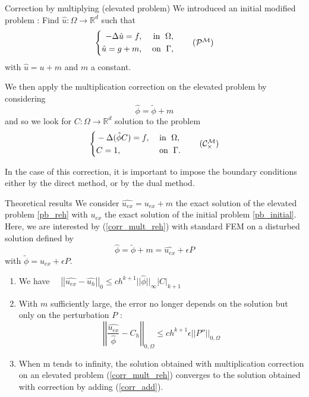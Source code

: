 \documentclass[compress,10pt,xcolor={table,dvipsnames},t]{beamer}
\begin{document}
	\begin{frame}{Correction by multiplying (elevated problem)}
		We introduced an initial modified problem : Find $\hat{u} : \Omega \rightarrow \mathbb{R}^d$ such that
		\begin{equation}
			\left\{
			\begin{aligned}
				-\Delta \hat{u} = f, \; &&\text{in } \; \Omega, \\
				\hat{u}=g+m, \; &&\text{on } \; \Gamma,
			\end{aligned}
			\right. \tag{$\mathcal{P}^\mathcal{M}$} \label{pb_reh}
		\end{equation}
		with $\hat{u}=u+m$ and $m$ a constant.
		
		We then apply the multiplication correction on the elevated problem by considering
		\begin{equation*}
			\hat{\phi}=\tilde{\phi}+m
		\end{equation*}
		and so we look for $C: \Omega \rightarrow \mathbb{R}^d$ solution to the problem
		\begin{equation*}
			\left\{\begin{aligned}
				&-\Delta (\hat{\phi}C)=f, \; &&\text{in } \; \Omega, \\
				&C=1, \; &&\text{on } \; \Gamma.
			\end{aligned}\right. \tag{$\mathcal{C}_\times^\mathcal{M}$} \label{corr_mult_reh}
		\end{equation*}
		
		In the case of this correction, it is important to impose the boundary conditions either by the direct method, or by the dual method.
	\end{frame}
	
	\begin{frame}{Theoretical results}
		We consider $\hat{u_{ex}}=u_{ex}+m$ the exact solution of the elevated problem \ref{pb_reh} with $u_{ex}$ the exact solution of the initial problem \ref{pb_initial}. \\
		Here, we are interested by (\ref{corr_mult_reh}) with standard FEM on a disturbed solution defined by
		$$\hat{\phi}=\tilde{\phi}+m=\hat{u_{ex}}+\epsilon P$$
		with $\tilde{\phi}=u_{ex}+\epsilon P$.
		\begin{enumerate}[\ding{217}]
			\item We have $\quad \left|\left|\hat{u_{ex}}-\hat{u_h}\right|\right|_0\le ch^{k+1}||\hat{\phi}||_\infty\left|C\right|_{k+1}$
			\item With $m$ sufficiently large, the error no longer depends on the solution but only on the perturbation $P$ :
			\begin{equation*}
				\left|\left|\frac{\hat{u_{ex}}}{\hat{\phi}}-C_h\right|\right|_{0,\Omega}\le ch^{k+1}\epsilon\left|\left|P''\right|\right|_{0,\Omega}
			\end{equation*}
			\item When m tends to infinity, the solution obtained with multiplication correction on an elevated problem  (\ref{corr_mult_reh}) converges to the solution obtained with correction by adding (\ref{corr_add}).
		\end{enumerate}
	\end{frame}
	
\end{document}
